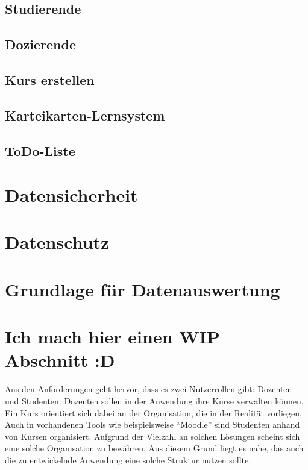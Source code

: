 


\subsection{Studierende}
\subsection{Dozierende}
\subsection{Kurs erstellen}
\subsection{Karteikarten-Lernsystem}
\subsection{ToDo-Liste}
\section{Datensicherheit}
\section{Datenschutz}
\section{Grundlage für Datenauswertung}








\section{Ich mach hier einen WIP Abschnitt :D}
Aus den Anforderungen geht hervor, dass es zwei Nutzerrollen gibt: Dozenten und Studenten.
Dozenten sollen in der Anwendung ihre Kurse verwalten können.
Ein Kurs orientiert sich dabei an der Organisation, die in der Realität vorliegen.
Auch in vorhandenen Tools wie beispielsweise \enquote{Moodle} sind Studenten anhand von Kursen organisiert.
Aufgrund der Vielzahl an solchen Lösungen scheint sich eine solche Organisation zu bewähren.
Aus diesem Grund liegt es nahe, das auch die zu entwickelnde Anwendung eine solche Struktur nutzen sollte.

